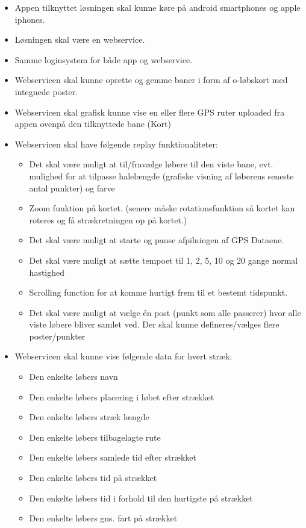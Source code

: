 \begin{itemize}
\item Appen tilknyttet løsningen skal kunne køre på android smartphones og apple iphones.
\item Løsningen skal være en webservice.
\item Samme loginsystem for både app og webservice.
\item Webservicen skal kunne oprette og gemme baner i form af o-løbskort med integnede poster.
\item Webservicen skal grafisk kunne vise en eller flere GPS ruter uploaded fra appen ovenpå den tilknyttede bane (Kort)
\item Webservicen skal have følgende replay funktionaliteter:
\begin{itemize}
\item Det skal være muligt at til/fravælge løbere til den viste bane, evt. mulighed for at tilpasse halelængde (grafiske visning af løberens seneste antal punkter) og farve
\item Zoom funktion på kortet. (senere måske rotationsfunktion så kortet kan roteres og få strækretningen op på kortet.)
\item Det skal være muligt at starte og pause afpilningen af GPS Dataene.
\item Det skal være muligt at sætte tempoet til 1, 2, 5, 10 og 20 gange normal hastighed
\item Scrolling function for at komme hurtigt frem til et bestemt tidspunkt.
\item Det skal være muligt at vælge én post (punkt som alle passerer) hvor alle viste løbere bliver samlet ved. Der skal kunne defineres/vælges flere poster/punkter
\end{itemize}
\item Webservicen skal kunne vise følgende data for hvert stræk:
\begin{itemize}
\item Den enkelte løbers navn
\item Den enkelte løbers placering i løbet efter strækket
\item Den enkelte løbers stræk længde
\item Den enkelte løbers tilbagelagte rute
\item Den enkelte løbers samlede tid efter strækket
\item Den enkelte løbers tid på strækket
\item Den enkelte løbers tid i forhold til den hurtigste på strækket
\item Den enkelte løbers gns. fart på strækket

\end{itemize}
\end{itemize}
